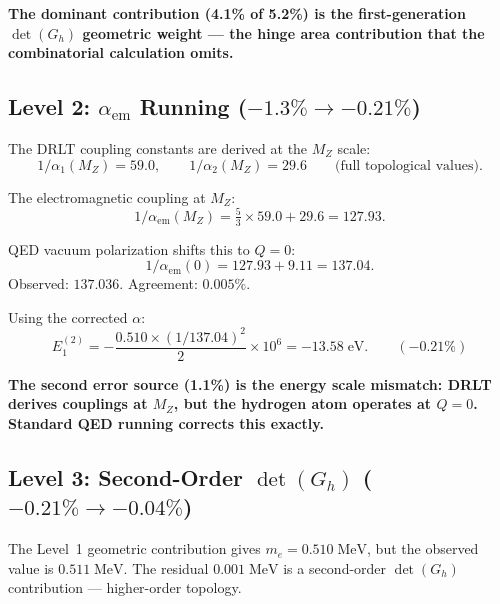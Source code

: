 \documentclass[12pt]{article}
\theoremstyle{remark}
\theoremstyle{definition}
\begin{document}
\textbf{The dominant contribution (4.1\% of 5.2\%) is the first-generation $\det(G_h)$ geometric weight --- the hinge area contribution that the combinatorial calculation omits.}

\subsection{Level 2: $\alpha_\text{em}$ Running ($-1.3\% \to -0.21\%$)}

The DRLT coupling constants are derived at the $M_Z$ scale:
\begin{equation}
1/\alpha_1(M_Z) = 59.0, \qquad 1/\alpha_2(M_Z) = 29.6 \qquad \text{(full topological values)}.
\end{equation}

The electromagnetic coupling at $M_Z$:
\begin{equation}
1/\alpha_\text{em}(M_Z) = \tfrac{5}{3} \times 59.0 + 29.6 = 127.93.
\end{equation}

QED vacuum polarization shifts this to $Q = 0$:
\begin{equation}
1/\alpha_\text{em}(0) = 127.93 + 9.11 = 137.04.
\end{equation}
Observed: $137.036$. Agreement: $0.005\%$.

Using the corrected $\alpha$:
\begin{equation}
E_1^{(2)} = -\frac{0.510 \times (1/137.04)^2}{2} \times 10^6 = -13.58\;\text{eV}. \qquad (-0.21\%)
\end{equation}

\textbf{The second error source (1.1\%) is the energy scale mismatch: DRLT derives couplings at $M_Z$, but the hydrogen atom operates at $Q = 0$. Standard QED running corrects this exactly.}

\subsection{Level 3: Second-Order $\det(G_h)$ ($-0.21\% \to -0.04\%$)}

The Level~1 geometric contribution gives $m_e = 0.510\;\text{MeV}$, but the observed value is $0.511\;\text{MeV}$. The residual $0.001\;\text{MeV}$ is a second-order $\det(G_h)$ contribution --- higher-order topology.
\end{document}
